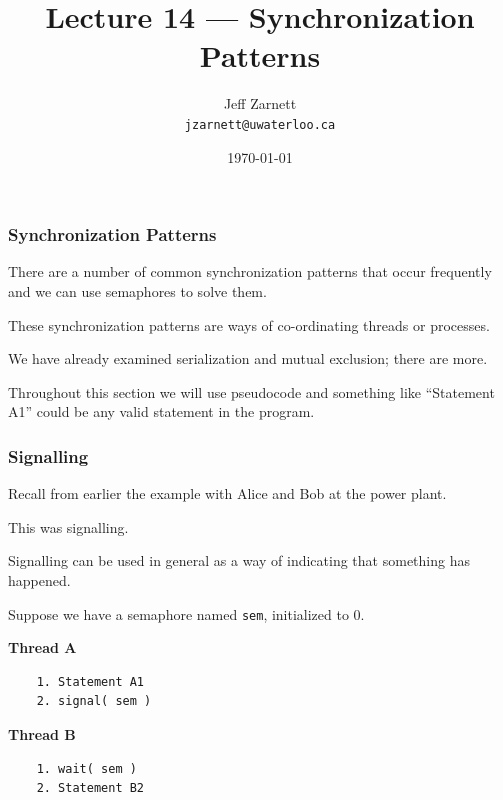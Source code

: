 

\title{Lecture 14 --- Synchronization Patterns }

\author{Jeff Zarnett \\ \small \texttt{jzarnett@uwaterloo.ca}}
\date{\today}




\begin{frame}
  \titlepage

 \end{frame}

\begin{frame}
\frametitle{Synchronization Patterns}


There are a number of common synchronization patterns that occur frequently and we can use semaphores to solve them. 

These synchronization patterns are ways of co-ordinating threads or processes. 

We have already examined serialization and mutual exclusion; there are more. 

Throughout this section we will use pseudocode and something like ``Statement A1'' could be any valid statement in the program.

\end{frame}

\begin{frame}[fragile]
\frametitle{Signalling}

Recall from earlier the example with Alice and Bob at the power plant. 

This was signalling.

Signalling can be used in general as a way of indicating that something has happened. 

Suppose we have a semaphore named \texttt{sem}, initialized to 0.

\begin{multicols}{2}
\textbf{Thread A}
  \begin{verbatim}
	1. Statement A1
	2. signal( sem )
  \end{verbatim}
\columnbreak
\textbf{Thread B}
  \begin{verbatim}
	1. wait( sem )
	2. Statement B2
  \end{verbatim}
\end{multicols}
\vspace{-2em}


\end{frame}

